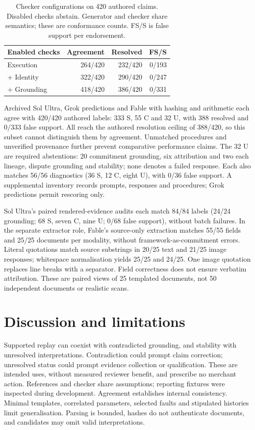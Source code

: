 \documentclass[sigconf,nonacm]{acmart}
\begin{document}
\begin{table}[t]
\caption{Checker configurations on 420 authored claims. Disabled checks abstain. Generator and checker share semantics; these are conformance counts. FS/S is false support per endorsement.}
\label{tab:results}
\small
\begin{tabularx}{\columnwidth}{@{}Xrrr@{}}
\toprule
Enabled checks & Agreement & Resolved & FS/S\\
\midrule
Execution & 264/420 & 232/420 & 0/193\\
+ Identity & 322/420 & 290/420 & 0/247\\
+ Grounding & 418/420 & 386/420 & 0/331\\
\bottomrule
\end{tabularx}
\end{table}

Archived Sol Ultra, Grok predictions and Fable with hashing and arithmetic each agree with 420/420 authored labels: 333 S, 55 C and 32 U, with 388 resolved and 0/333 false support. All reach the authored resolution ceiling of 388/420, so this subset cannot distinguish them by agreement. Unmatched procedures and unverified provenance further prevent comparative performance claims. The 32 U are required abstentions: 20 commitment grounding, six attribution and two each lineage, dispute grounding and stability; none denotes a failed response. Each also matches 56/56 diagnostics (36 S, 12 C, eight U), with 0/36 false support. A supplemental inventory records prompts, responses and procedures; Grok predictions permit rescoring only.

Sol Ultra's paired rendered-evidence audits each match 84/84 labels (24/24 grounding; 68 S, seven C, nine U; 0/68 false support), without batch failures. In the separate extractor role, Fable's source-only extraction matches 55/55 fields and 25/25 documents per modality, without framework-as-commitment errors. Literal quotations match source substrings in 20/25 text and 21/25 image responses; whitespace normalisation yields 25/25 and 24/25. One image quotation replaces line breaks with a separator. Field correctness does not ensure verbatim attribution. These are paired views of 25 templated documents, not 50 independent documents or realistic scans.

\section{Discussion and limitations}

Supported replay can coexist with contradicted grounding, and stability with unresolved interpretations. Contradiction could prompt claim correction; unresolved status could prompt evidence collection or qualification. These are intended uses, without measured reviewer benefit, and prescribe no merchant action. References and checker share assumptions; reporting fixtures were inspected during development. Agreement establishes internal consistency. Minimal templates, correlated parameters, selected faults and stipulated histories limit generalisation. Parsing is bounded, hashes do not authenticate documents, and candidates may omit valid interpretations.
\end{document}
